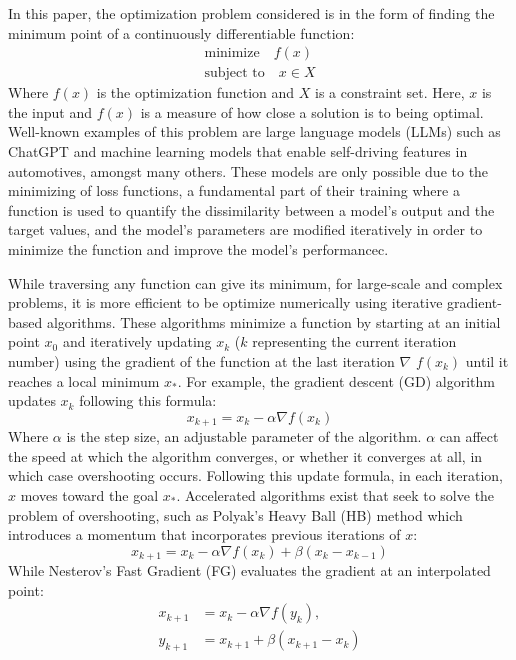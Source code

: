 In this paper, the optimization problem considered is in the form of finding the minimum point of a continuously differentiable function:
\begin{subequations}\label{opt prob}
  \begin{align}
    \textrm{minimize} \quad f(x) \\
    \textrm{subject to} \quad x \in X
  \end{align}
\end{subequations}
Where \(f(x)\) is the optimization function and \(X\) is a constraint set. Here, \(x\) is the input and \(f(x)\) is a measure of how close a solution is to being optimal. Well-known examples of this problem are large language models (LLMs) such as ChatGPT and machine learning models that enable self-driving features in automotives, amongst many others. These models are only possible due to the minimizing of loss functions, a fundamental part of their training where a function is used to quantify the dissimilarity between a model's output and the target values, and the model's parameters are modified iteratively in order to minimize the function and improve the model's performancec.

While traversing any function can give its minimum, for large-scale and complex problems, it is more efficient to be optimize numerically using iterative gradient-based  algorithms. These algorithms minimize a function by starting at an initial point \(x_{0}\) and iteratively updating \(x_k\) (\(k\) representing the current iteration number) using the gradient of the function at the last iteration $\nabla$ \(f(x_k)\) until it reaches a local minimum \(x_*\). For example, the gradient descent (GD) algorithm updates \(x_k\) following this formula:
\begin{equation}\label{eqn:GD}
  x_{k+1}=x_{k}-\alpha \nabla f(x_k)
\end{equation}
Where $\alpha$ is the step size, an adjustable parameter of the algorithm. $\alpha$ can affect the speed at which the algorithm converges, or whether it converges at all, in which case overshooting occurs. Following this update formula, in each iteration, \(x\) moves toward the goal \(x_*\). Accelerated algorithms exist that seek to solve the problem of overshooting, such as Polyak’s Heavy Ball (HB) method which introduces a momentum that incorporates previous iterations of \(x\):
\begin{equation}\label{eqn:HB}
  x_{k+1}=x_k-\alpha \nabla f(x_k)+ \beta (x_k-x_{k-1})
\end{equation}
While Nesterov’s Fast Gradient (FG) evaluates the gradient at an interpolated point:
\begin{subequations} \label{eqn:FG}
  \begin{align}
    x_{k+1}     &=x_k-\alpha \nabla f(y_k), \label{eq_state}       \\
    y_{k+1} &=x_{k+1}+\beta (x_{k+1}-x_k) \label{eq_interpolated point}
  \end{align}
  \end{subequations}
